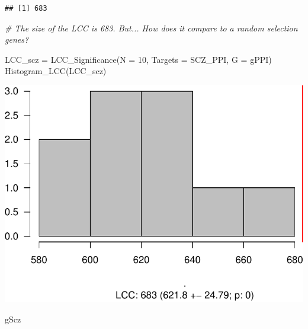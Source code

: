 \documentclass[
]{book}
\newenvironment{Shaded}{\begin{snugshade}}{\end{snugshade}}
\newcommand{\AttributeTok}[1]{\textcolor[rgb]{0.77,0.63,0.00}{#1}}
\newcommand{\CommentTok}[1]{\textcolor[rgb]{0.56,0.35,0.01}{\textit{#1}}}
\newcommand{\DecValTok}[1]{\textcolor[rgb]{0.00,0.00,0.81}{#1}}
\newcommand{\FunctionTok}[1]{\textcolor[rgb]{0.00,0.00,0.00}{#1}}
\newcommand{\NormalTok}[1]{#1}
\newcommand{\OtherTok}[1]{\textcolor[rgb]{0.56,0.35,0.01}{#1}}
\newcommand{\SpecialCharTok}[1]{\textcolor[rgb]{0.00,0.00,0.00}{#1}}
\begin{document}
\begin{Shaded}
\end{Shaded}

\begin{verbatim}
## [1] 683
\end{verbatim}

\begin{Shaded}
\begin{Highlighting}[]
\CommentTok{\# The size of the LCC is 683. But... How does it compare to a random selection genes?}

\NormalTok{LCC\_scz }\OtherTok{=} \FunctionTok{LCC\_Significance}\NormalTok{(}\AttributeTok{N =} \DecValTok{10}\NormalTok{, }\AttributeTok{Targets =}\NormalTok{ SCZ\_PPI,}
                           \AttributeTok{G =}\NormalTok{ gPPI)}
\FunctionTok{Histogram\_LCC}\NormalTok{(LCC\_scz)}
\end{Highlighting}
\end{Shaded}

\includegraphics{NetMed_files/figure-latex/unnamed-chunk-23-1.pdf}

\begin{Shaded}
\begin{Highlighting}[]
\NormalTok{gScz }
\end{Highlighting}
\end{Shaded}
\end{document}
